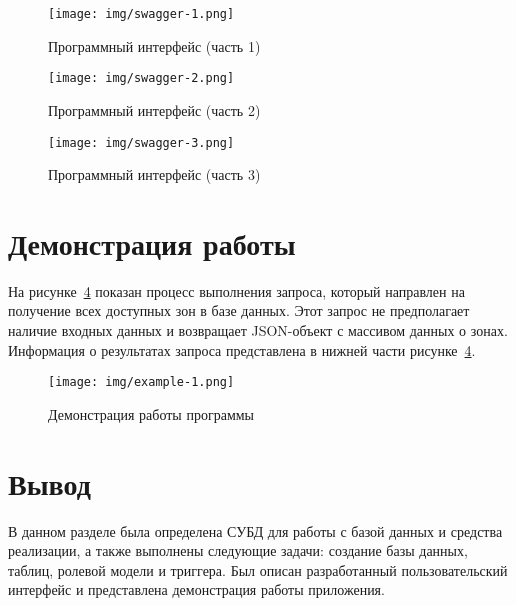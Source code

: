 \clearpage

\begin{figure}[h]
	\centering
	\texttt{[image: img/swagger-1.png]}
	\caption{Программный интерфейс (часть 1)}
	\label{fig:swagger-1}
\end{figure}

\begin{figure}[h]
	\centering
	\texttt{[image: img/swagger-2.png]}
	\caption{Программный интерфейс (часть 2)}
	\label{fig:swagger-2}
\end{figure}

\clearpage

\begin{figure}[h]
	\centering
	\texttt{[image: img/swagger-3.png]}
	\caption{Программный интерфейс (часть 3)}
	\label{fig:swagger-3}
\end{figure}

\section{Демонстрация работы}

На рисунке~\ref{fig:example-1} показан процесс выполнения запроса, который направлен на получение всех доступных зон в базе данных. Этот запрос не предполагает наличие входных данных и возвращает JSON-объект с массивом данных о зонах. Информация о результатах запроса представлена в нижней части рисунке~\ref{fig:example-1}.

\clearpage

\begin{figure}[h]
	\centering
	\texttt{[image: img/example-1.png]}
	\caption{Демонстрация работы программы}
	\label{fig:example-1}
\end{figure}

\section*{Вывод}
В данном разделе была определена СУБД для работы с базой данных и средства реализации,  а также выполнены следующие задачи:  создание базы данных, таблиц, ролевой модели и триггера. Был описан разработанный пользовательский интерфейс и представлена демонстрация работы приложения. 